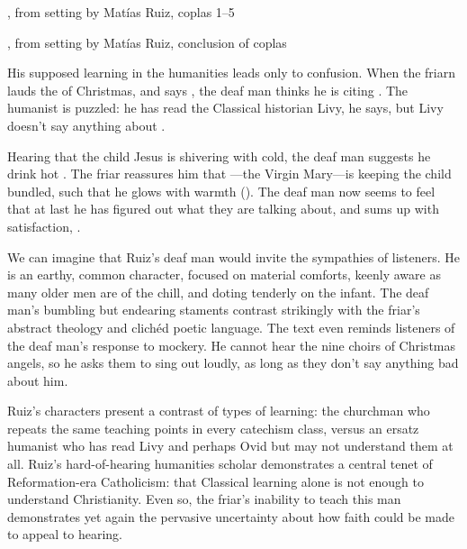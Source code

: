 \begin{expoem}
  \caption{, from setting by Matías Ruiz, coplas 1--5}
  \label{expoem:Pues_la_fiesta-Ruiz-coplas-1}
\end{expoem}

\begin{expoem}
  \caption{, from setting by Matías Ruiz, conclusion of coplas}
  \label{expoem:Pues_la_fiesta-Ruiz-coplas-2}
\end{expoem}

His supposed learning in the humanities leads only to confusion.
When the friarn lauds the  of Christmas, and says , the deaf man thinks he is citing .
The humanist is puzzled: he has read the Classical historian Livy, he says, but Livy doesn't say anything about .

Hearing that the child Jesus is shivering with cold, the deaf man suggests he drink hot .
The friar reassures him that ---the Virgin Mary---is keeping the child bundled, such that he glows with warmth ().
The deaf man now seems to feel that at last he has figured out what they are talking about, and sums up with satisfaction, .

We can imagine that Ruiz's deaf man would invite the sympathies of listeners.
He is an earthy, common character, focused on material comforts, keenly aware as many older men are of the chill, and doting tenderly on the infant.
The deaf man's bumbling but endearing staments contrast strikingly with the friar's abstract theology and clichéd poetic language.
The text even reminds listeners of the deaf man's response to mockery.
He cannot hear the nine choirs of Christmas angels, so he asks them to sing out loudly, as long as they don't say anything bad about him.

Ruiz's characters present a contrast of types of learning: the churchman who repeats the same teaching points in every catechism class, versus an ersatz humanist who has read Livy and perhaps Ovid but may not understand them at all.
Ruiz's hard-of-hearing humanities scholar demonstrates a central tenet of Reformation-era Catholicism: that Classical learning alone is not enough to understand Christianity.
Even so, the friar's inability to teach this man demonstrates yet again the pervasive uncertainty about how faith could be made to appeal to hearing.


